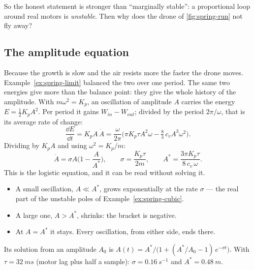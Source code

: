 So the honest statement is stronger than \enquote{marginally stable}: a proportional loop around real motors is \emph{unstable}. Then why does the drone of \cref{fig:spring-run} not fly away?

\subsection{The amplitude equation}
Because the growth is slow and the air resists more the faster the drone moves. Example~\ref{ex:spring-limit} balanced the two over one period. The same two energies give more than the balance point: they give the whole history of the amplitude. With $m\omega^2 = K_p$, an oscillation of amplitude $A$ carries the energy $E = \tfrac12 K_p A^2$. Per period it gains $W_{in} - W_{out}$; divided by the period $2\pi/\omega$, that is its average rate of change:
\begin{equation*}
  \frac{\dd E}{\dd t} = K_p A\,\dot A = \frac{\omega}{2\pi}\Big(\pi K_p\tau A^2\omega - \tfrac83\,c_v A^3\omega^2\Big).
\end{equation*}
Dividing by $K_p A$ and using $\omega^2 = K_p/m$:
\begin{equation}\label{eq:spring-amp}
  \dot A = \sigma A\Big(1 - \frac{A}{A^*}\Big), \qquad
  \sigma = \frac{K_p\tau}{2m}, \qquad
  A^* = \frac{3\pi K_p\tau}{8\,c_v\,\omega}.
\end{equation}
This is the logistic equation, and it can be read without solving it.
\begin{itemize}
  \item A small oscillation, $A \ll A^*$, grows exponentially at the rate $\sigma$ — the real part of the unstable poles of Example~\ref{ex:spring-cubic}.
  \item A large one, $A > A^*$, shrinks: the bracket is negative.
  \item At $A = A^*$ it stays. Every oscillation, from either side, ends there.
\end{itemize}
Its solution from an amplitude $A_0$ is $A(t) = A^*\big/\big(1 + (A^*/A_0 - 1)\,e^{-\sigma t}\big)$. With $\tau = \SI{32}{ms}$ (motor lag plus half a sample): $\sigma = \SI{0.16}{s^{-1}}$ and $A^* = \SI{0.48}{m}$.

